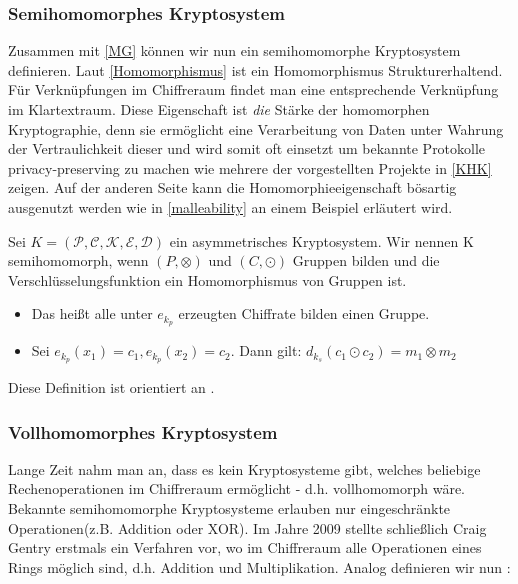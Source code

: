 \subsubsection{Semihomomorphes Kryptosystem}

Zusammen mit \ref{MG} können wir nun ein semihomomorphe Kryptosystem definieren. Laut \ref{Homomorphismus} ist ein Homomorphismus Strukturerhaltend. Für Verknüpfungen im Chiffreraum findet man eine entsprechende Verknüpfung im Klartextraum. Diese Eigenschaft ist \textit{die} Stärke der homomorphen Kryptographie, denn sie ermöglicht eine Verarbeitung von Daten unter Wahrung der Vertraulichkeit dieser und wird somit oft einsetzt um bekannte Protokolle privacy-preserving zu machen wie mehrere der vorgestellten Projekte in \ref{KHK} zeigen. Auf der anderen Seite kann die Homomorphieeigenschaft bösartig ausgenutzt werden wie in \ref{malleability} an einem Beispiel erläutert wird.

\begin{theorem}
	\label{PKS}
	Sei $K = (\mathcal{P},\mathcal{C},\mathcal{K},\mathcal{E},\mathcal{D})$ ein asymmetrisches Kryptosystem. Wir nennen K semihomomorph, wenn $(P,\otimes)$ und $(C,\odot)$ Gruppen bilden und die Verschlüsselungsfunktion ein Homomorphismus von Gruppen ist. 
	\begin{itemize}
		\item Das heißt alle unter $e_{k_p}$ erzeugten Chiffrate bilden einen Gruppe.
		\item Sei $e_{k_p}(x_1)=c_1,e_{k_p}(x_2)=c_2$. Dann gilt: $d_{k_s}(c_1\odot c_2)= m_1\otimes m_2$
	\end{itemize}
\end{theorem}

Diese Definition ist orientiert an \cite[p.499]{katz2014introduction}.

\subsubsection{Vollhomomorphes Kryptosystem}

Lange Zeit nahm man an, dass es kein Kryptosysteme gibt, welches beliebige Rechenoperationen im Chiffreraum ermöglicht - d.h. vollhomomorph wäre. Bekannte semihomomorphe Kryptosysteme erlauben nur eingeschränkte Operationen(z.B. Addition oder XOR). Im Jahre 2009 stellte schließlich Craig Gentry \cite{gentry2009fully} erstmals ein Verfahren vor, wo im Chiffreraum alle Operationen eines Rings möglich sind, d.h. Addition und Multiplikation. Analog definieren wir nun \cite[p.47]{yi2014homomorphic}:

